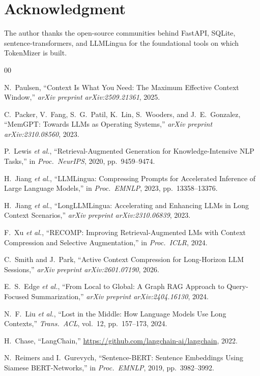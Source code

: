 \documentclass[journal]{IEEEtran}
\begin{document}
\section*{Acknowledgment}
The author thanks the open-source communities behind
FastAPI, SQLite, sentence-transformers, and LLMLingua
for the foundational tools on which TokenMizer is built.

\begin{thebibliography}{00}

N.~Paulsen, ``Context Is What You Need: The Maximum Effective
Context Window,'' \emph{arXiv preprint arXiv:2509.21361},
2025.

C.~Packer, V.~Fang, S.~G.~Patil, K.~Lin, S.~Wooders, and
J.~E.~Gonzalez, ``MemGPT: Towards LLMs as Operating
Systems,'' \emph{arXiv preprint arXiv:2310.08560}, 2023.

P.~Lewis \emph{et al.}, ``Retrieval-Augmented Generation for
Knowledge-Intensive NLP Tasks,'' in \emph{Proc.\ NeurIPS},
2020, pp.\ 9459--9474.

H.~Jiang \emph{et al.}, ``LLMLingua: Compressing Prompts for
Accelerated Inference of Large Language Models,'' in
\emph{Proc.\ EMNLP}, 2023, pp.\ 13358--13376.

H.~Jiang \emph{et al.}, ``LongLLMLingua: Accelerating and
Enhancing LLMs in Long Context Scenarios,''
\emph{arXiv preprint arXiv:2310.06839}, 2023.

F.~Xu \emph{et al.}, ``RECOMP: Improving Retrieval-Augmented
LMs with Context Compression and Selective Augmentation,''
in \emph{Proc.\ ICLR}, 2024.

C.~Smith and J.~Park, ``Active Context Compression for
Long-Horizon LLM Sessions,''
\emph{arXiv preprint arXiv:2601.07190}, 2026.

E.~S.~Edge \emph{et al.}, ``From Local to Global: A Graph
RAG Approach to Query-Focused Summarization,''
\emph{arXiv preprint arXiv:2404.16130}, 2024.

N.~F.~Liu \emph{et al.}, ``Lost in the Middle: How Language
Models Use Long Contexts,'' \emph{Trans.\ ACL}, vol.\ 12,
pp.\ 157--173, 2024.

H.~Chase, ``LangChain,''
\url{https://github.com/langchain-ai/langchain}, 2022.

N.~Reimers and I.~Gurevych, ``Sentence-BERT: Sentence
Embeddings Using Siamese BERT-Networks,'' in
\emph{Proc.\ EMNLP}, 2019, pp.\ 3982--3992.


\end{thebibliography}
\end{document}
